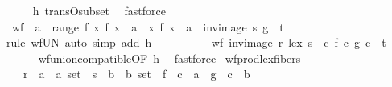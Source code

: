 \begin{isabellebody}
\ \ \ \isamarkupfalse%
\ h{}\ trans{\isacharunderscore}{\kern0pt}O{\isacharunderscore}{\kern0pt}subset\ \isamarkupfalse%
\ fastforce\isanewline
\ \ \isamarkupfalse%
\ \isamarkupfalse%
\ {\isachardoublequoteopen}wf\ {\isacharparenleft}{\kern0pt}{\isasymUnion}\ a\ {\isasymin}\ range\ f{\isachardot}{\kern0pt}\ {\isacharbraceleft}{\kern0pt}x{\isachardot}{\kern0pt}\ f\ x\ {\isacharequal}{\kern0pt}\ a{\isacharbraceright}{\kern0pt}\ {\isasymtimes}\ {\isacharbraceleft}{\kern0pt}x{\isachardot}{\kern0pt}\ f\ x\ {\isacharequal}{\kern0pt}\ a{\isacharbraceright}{\kern0pt}\ {\isasyminter}\ {\isacharparenleft}{\kern0pt}inv{\isacharunderscore}{\kern0pt}image\ s\ g{\isacharparenright}{\kern0pt}\ {\isasyminter}\ t{\isacharparenright}{\kern0pt}{\isachardoublequoteclose}\isanewline
\ \ \ \ \isamarkupfalse%
{\isacharparenleft}{\kern0pt}rule\ wf{\isacharunderscore}{\kern0pt}UN{\isacharcomma}{\kern0pt}\ auto\ simp\ add{\isacharcolon}{\kern0pt}\ h{}{\isacharparenright}{\kern0pt}\isanewline
\ \ \ \ \isamarkupfalse%
\isanewline
\ \ \isamarkupfalse%
\ \isamarkupfalse%
\ {\isachardoublequoteopen}wf\ {\isacharparenleft}{\kern0pt}inv{\isacharunderscore}{\kern0pt}image\ {\isacharparenleft}{\kern0pt}r\ {\isacharless}{\kern0pt}{\isacharasterisk}{\kern0pt}lex{\isacharasterisk}{\kern0pt}{\isachargreater}{\kern0pt}\ s{\isacharparenright}{\kern0pt}\ {\isacharparenleft}{\kern0pt}{\isasymlambda}\ c{\isachardot}{\kern0pt}\ {\isacharparenleft}{\kern0pt}f\ c{\isacharcomma}{\kern0pt}\ g\ c{\isacharparenright}{\kern0pt}{\isacharparenright}{\kern0pt}\ {\isasyminter}\ t{\isacharparenright}{\kern0pt}{\isachardoublequoteclose}\ \isanewline
\ \ \ \ \isamarkupfalse%
\ wf{\isacharunderscore}{\kern0pt}union{\isacharunderscore}{\kern0pt}compatible{\isacharbrackleft}{\kern0pt}OF\ h{}{\isacharbrackright}{\kern0pt}\ \isamarkupfalse%
\ fastforce\isanewline
{}\isamarkupfalse%
%
\endisatagproof
{\isafoldproof}%
%
\isadelimproof
\isanewline
%
\endisadelimproof
\isanewline
{}\isamarkupfalse%
\ wf{\isacharunderscore}{\kern0pt}prod{\isacharunderscore}{\kern0pt}lex{\isacharunderscore}{\kern0pt}fibers{\isacharcolon}{\kern0pt}\ \isanewline
\ \ \ r\ {\isacharcolon}{\kern0pt}{\isacharcolon}{\kern0pt}\ {\isachardoublequoteopen}{\isacharparenleft}{\kern0pt}{\isacharprime}{\kern0pt}a\ {\isasymtimes}\ {\isacharprime}{\kern0pt}a{\isacharparenright}{\kern0pt}\ set{\isachardoublequoteclose}\ \ s\ {\isacharcolon}{\kern0pt}{\isacharcolon}{\kern0pt}\ {\isachardoublequoteopen}{\isacharparenleft}{\kern0pt}{\isacharprime}{\kern0pt}b\ {\isasymtimes}\ {\isacharprime}{\kern0pt}b{\isacharparenright}{\kern0pt}\ set{\isachardoublequoteclose}\ \ f\ {\isacharcolon}{\kern0pt}{\isacharcolon}{\kern0pt}\ {\isachardoublequoteopen}{\isacharprime}{\kern0pt}c\ {\isasymRightarrow}\ {\isacharprime}{\kern0pt}a{\isachardoublequoteclose}\ \ g\ {\isacharcolon}{\kern0pt}{\isacharcolon}{\kern0pt}\ {\isachardoublequoteopen}{\isacharprime}{\kern0pt}c\ {\isasymRightarrow}\ {\isacharprime}{\kern0pt}b{\isachardoublequoteclose}\isanewline

\end{isabellebody}
